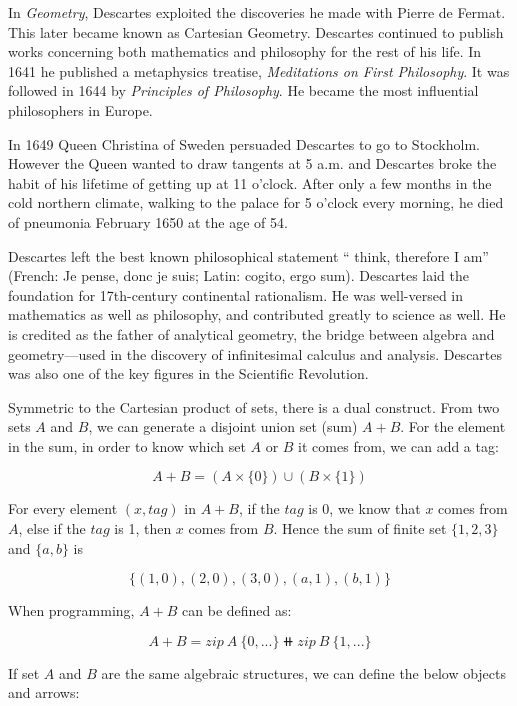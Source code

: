 \documentclass{article}
\begin{document}
In {\em Geometry}, Descartes exploited the discoveries he made with Pierre de Fermat. This later became known as Cartesian Geometry. Descartes continued to publish works concerning both mathematics and philosophy for the rest of his life. In 1641 he published a metaphysics treatise, {\em Meditations on First Philosophy}. It was followed in 1644 by {\em Principles of Philosophy}. He became the most influential philosophers in Europe.

In 1649 Queen Christina of Sweden persuaded Descartes to go to Stockholm. However the Queen wanted to draw tangents at 5 a.m. and Descartes broke the habit of his lifetime of getting up at 11 o'clock. After only a few months in the cold northern climate, walking to the palace for 5 o'clock every morning, he died of pneumonia February 1650 at the age of 54.

Descartes left the best known philosophical statement `` think, therefore I am'' (French: Je pense, donc je suis; Latin: cogito, ergo sum). Descartes laid the foundation for 17th-century continental rationalism. He was well-versed in mathematics as well as philosophy, and contributed greatly to science as well. He is credited as the father of analytical geometry, the bridge between algebra and geometry—used in the discovery of infinitesimal calculus and analysis. Descartes was also one of the key figures in the Scientific Revolution.

\vspace{5mm}

Symmetric to the Cartesian product of sets, there is a dual construct. From two sets $A$ and $B$, we can generate a disjoint union set (sum) $A + B$. For the element in the sum, in order to know which set $A$ or $B$ it comes from, we can add a tag:

\[
A + B = (A \times \{0\}) \cup (B \times \{1\})
\]

For every element $(x, tag)$ in $A + B$, if the $tag$ is 0, we know that $x$ comes from $A$, else if the $tag$ is 1, then $x$ comes from $B$. Hence the sum of finite set $\{1, 2, 3\}$ and $\{a, b\}$ is

\[
\{(1, 0), (2, 0), (3, 0), (a, 1), (b, 1)\}
\]

When programming, $A + B$ can be defined as:

\begin{mdframed}
\[
A + B = zip\ A\ \{0, ...\} \doubleplus zip\ B\ \{1, ...\}
\]
\end{mdframed}

If set $A$ and $B$ are the same algebraic structures, we can define the below objects and arrows:
\end{document}
